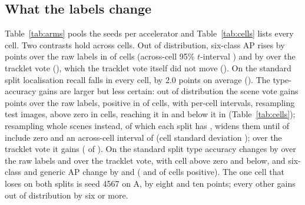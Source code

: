 \documentclass{article}
\begin{document}
\subsection{What the labels change}
Table~\ref{tab:arms} pools the seeds per accelerator and Table~\ref{tab:cells} lists every cell. Two contrasts hold across cells. Out of distribution, six-class AP rises by \SvSixOODVsRawGain{} points over the raw labels in \SvSixOODVsRawPos{} of \SvCells{} cells (across-cell 95\% $t$-interval \SvSixOODVsRawCI) and by \SvSixOODVsTrkGain{} over the tracklet vote (\SvSixOODVsTrkCI), which the tracklet vote itself did not move (\SvSixOODTrkVsRawGain). On the standard split localisation recall falls in every cell, by 2.0 points on average (\SvRecStdVsRawCI). The type-accuracy gains are larger but less certain: out of distribution the scene vote gains \SvTypeOODVsRawGain{} points over the raw labels, positive in \SvTypeOODVsRawPos{} of \SvCells{} cells, with per-cell intervals, resampling test images, above zero in \SvOODAbove{} cells, reaching it in \SvOODStraddle{} and below it in \SvOODBelow{} (Table~\ref{tab:cells}); resampling whole scenes instead, of which each split has \SceneBootScenes, widens them until \SceneBootZero{} of \SceneBootCells{} include zero and an across-cell interval of \SvTypeOODVsRawCI{} (cell standard deviation \SvTypeOODVsRawSD); over the tracklet vote it gains \SvTypeOODVsTrkGain{} (\SvTypeOODVsTrkPos{} of \SvCells). On the standard split type accuracy changes by \SvTypeStdVsRawGain{} over the raw labels and \SvTypeStdVsTrkGain{} over the tracklet vote, with \SvStdAbove{} cell above zero and \SvStdBelow{} below, and six-class and generic AP change by \SvSixStdVsRawGain{} and \SvGenStdVsRawGain{} (\SvSixStdVsRawPos{} and \SvGenStdVsRawPos{} of \SvCells{} cells positive). The one cell that loses on both splits is seed 4567 on A, by eight and ten points; every other gains out of distribution by six or more.
\end{document}

